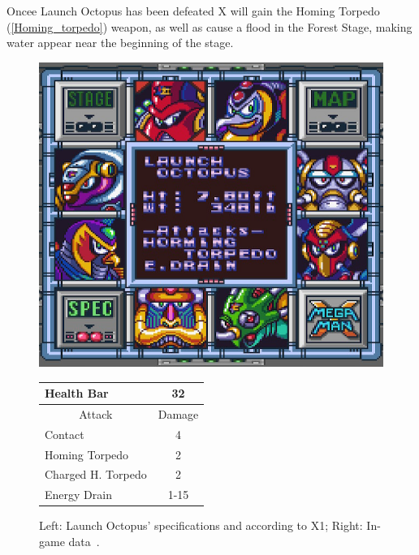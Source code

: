 Oncee Launch Octopus has been defeated X will gain the Homing Torpedo (\ref{Homing_torpedo}) weapon, as well as cause a flood in the Forest Stage, making water appear near the beginning of the stage.
\begin{figure}[htp]
	\begin{minipage}[c]{0.45\linewidth}
		\vspace{0pt}
		\centering
		\includegraphics[width=\linewidth]{figures/X1/Launch_octopus/Launch_octopus_specs.png}
	\end{minipage}
	\begin{minipage}[c]{0.45\linewidth}
		\centering
		\vspace{0pt}
		\begin{tabular}[h]{l c}
			\toprule
			Health Bar & 32\\
			\midrule
			\multicolumn{1}{c}{Attack} & \multicolumn{1}{c}{Damage}\\
			Contact & 4\\
			Homing Torpedo & 2\\
			Charged H. Torpedo & 2\\
			Energy Drain & 1-15\\
			\bottomrule
		\end{tabular}
	\end{minipage}
	\caption{Left: Launch Octopus' specifications and according to X1; Right: In-game data~\cite{wiki:Launch_octopus}. }
	\label{Octopus_specs}
\end{figure}


